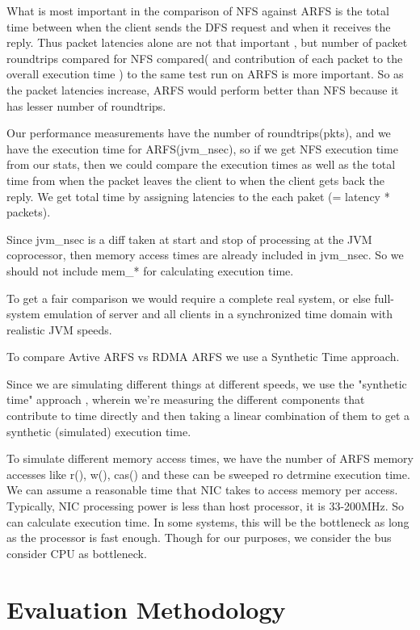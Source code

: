 \documentclass[10pt]{article}
\begin{document}
What is most important in the comparison of NFS against ARFS is the total
time between when the client sends the DFS request and when it receives the
reply. Thus packet latencies alone are not that important , but number of packet
roundtrips compared for NFS compared( and contribution of each packet to the
overall execution time ) to the same test run on ARFS is more important. So
as the packet latencies increase, ARFS would perform better than NFS because
it has lesser number of roundtrips.

Our performance measurements have the number of roundtrips(pkts), and we have
the execution time for ARFS(jvm_nsec), so if we get NFS execution time from
our stats, then we could compare the execution times as well as the total time
from when the packet leaves the client to when the client gets back the reply.
We get total time by assigning latencies to the each paket (= latency * packets).

Since jvm_nsec is a diff taken at start and stop of processing at the JVM coprocessor,
then memory access times are already included in jvm_nsec. So we should not include mem_* for
calculating execution time.

To get a fair comparison we would require a complete real system, or else full-system emulation of
server and all clients in a synchronized time domain with realistic JVM speeds.

To compare Avtive ARFS vs RDMA ARFS we use a Synthetic Time approach.

Since we are simulating different things at different speeds, we use the "synthetic time"
approach , wherein we're measuring the different components that contribute to time directly
and then taking a linear combination of them to get a synthetic (simulated) execution time.

To simulate different memory access times, we have the number of ARFS memory accesses like
r(), w(), cas() and these can be sweeped ro detrmine execution time. We can assume a reasonable
time that NIC takes to access memory per access. Typically, NIC processing power is less than host
processor, it is 33-200MHz. So can calculate execution time. In some systems, this will be the
bottleneck as long as the processor is fast enough. Though for our purposes, we consider the bus
consider CPU as bottleneck. 

\section{Evaluation Methodology}
\end{document}
